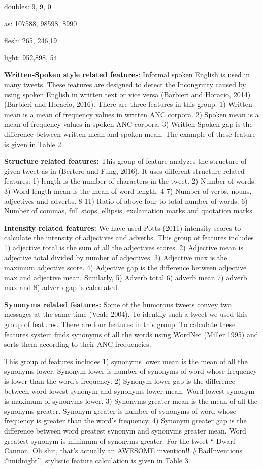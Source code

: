 \documentclass{article} %
\begin{document}
\noindent doubles: 9, 9, 0

\noindent as: 107588, 98598, 8990

\noindent flesh: 265, 246,19

\noindent light: 952,898, 54

\textbf{Written-Spoken style related features}: Informal spoken English is used in many tweets. These features are designed to detect the Incongruity caused by using spoken English in written text or vice versa (Barbieri and Horacio, 2014) (Barbieri and Horacio, 2016). There are three features in this group: 1) Written mean is a mean of frequency values in written ANC corpora. 2) Spoken mean is a mean of frequency values in spoken ANC corpora. 3) Written Spoken gap is the difference between written mean and spoken mean. The example of these feature is given in Table 2.

\textbf{Structure related features: }This group of feature analyzes the structure of given tweet as in (Bertero and Fung, 2016). It uses different structure related features: 1) length is the number of characters in the tweet. 2) Number of words. 3) Word length mean is the mean of word length. 4-7)  Number of verbs, nouns, adjectives and adverbs. 8-11) Ratio of above four to total number of words. 6) Number of commas, full stops, ellipsis, exclamation marks and quotation marks.

\textbf{Intensity related features: }We have used Potts (2011) intensity scores to calculate the intensity of adjectives and adverbs. This group of features includes 1) adjective total is the sum of all the adjectives scores. 2) Adjective mean is adjective total divided by number of adjectives. 3) Adjective max is the maximum adjective score. 4) Adjective gap is the difference between adjective max and adjective mean. Similarly, 5) Adverb total 6) adverb mean 7) adverb max and 8) adverb gap is calculated.

\textbf{Synonyms related features: }Some of the humorous tweets convey two messages at the same time (Veale 2004). To identify such a tweet we used this group of features.  There are four features in this group. To calculate these features system finds synonyms of all the words using WordNet (Miller 1995) and sorts them according to their ANC frequencies. 

This group of features includes 1) synonyms lower mean is the mean of all the synonyms lower. Synonym lower is number of synonyms of word whose frequency is lower than the word's frequency. 2) Synonym lower gap is the difference between word lowest synonym and synonyms lower mean. Word lowest synonym is maximum of synonyms lower. 3) Synonyms greater mean is the mean of all the synonyms greater. Synonym greater is number of synonyms of word whose frequency is greater than the word's frequency. 4) Synonym greater gap is the difference between word greatest synonym and synonyms greater mean. Word greatest synonym is minimum of synonyms greater. For the tweet `` Dwarf Cannon. Oh shit, that's actually an AWESOME invention!! \#BadInventions @midnight'', stylistic feature calculation is given in Table 3.
\end{document}
